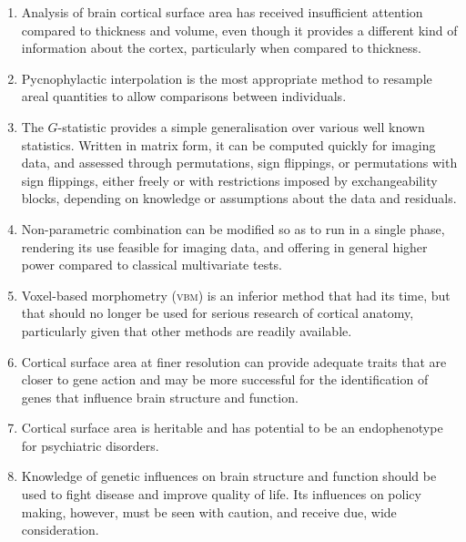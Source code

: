 \begin{enumerate}[leftmargin=*]
\item Analysis of brain cortical surface area has received insufficient attention compared to thickness and volume, even though it provides a different kind of information about the cortex, particularly when compared to thickness.
\item Pycnophylactic interpolation is the most appropriate method to resample areal quantities to allow comparisons between individuals.
\item The $G$-statistic provides a simple generalisation over various well known statistics. Written in matrix form, it can be computed quickly for imaging data, and assessed through permutations, sign flippings, or permutations with sign flippings, either freely or with restrictions imposed by exchangeability blocks,  depending on knowledge or assumptions about the data and residuals.
\item Non-parametric combination can be modified so as to run in a single phase, rendering its use feasible for imaging data, and offering in general higher power compared to classical multivariate tests.
\item Voxel-based morphometry (\textsc{vbm}) is an inferior method that had its time, but that should no longer be used for serious research of cortical anatomy, particularly given that other methods are readily available.
\item Cortical surface area at finer resolution can provide adequate traits that are closer to gene action and may be more successful for the identification of genes that influence brain structure and function.
\item Cortical surface area is heritable and has potential to be an endophenotype for psychiatric disorders.
\item Knowledge of genetic influences on brain structure and function should be used to fight disease and improve quality of life. Its influences on policy making, however, must be seen with caution, and receive due, wide consideration.
\end{enumerate}
\vspace*{\fill}